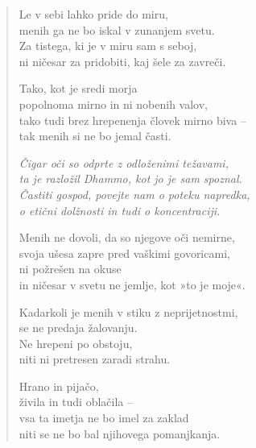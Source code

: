 \clearpage
\begin{verse}

Le v sebi lahko pride do miru,\\
menih ga ne bo iskal v zunanjem svetu.\\
Za tistega, ki je v miru sam s seboj,\\
ni ničesar za pridobiti, kaj šele za zavreči.

Tako, kot je sredi morja\\
popolnoma mirno in ni nobenih valov,\\
tako tudi brez hrepenenja človek mirno biva --\\
tak menih si ne bo jemal časti.

\emph{Čigar oči so odprte z odloženimi težavami,}\\
\emph{ta je razložil Dhammo, kot jo je sam spoznal.}\\
\emph{Častiti gospod, povejte nam o poteku napredka,}\\
\emph{o etični dolžnosti in tudi o koncentraciji.}

Menih ne dovoli, da so njegove oči nemirne,\\
svoja ušesa zapre pred vaškimi govoricami,\\
ni požrešen na okuse\\
in ničesar v svetu ne jemlje, kot »to je moje«.

Kadarkoli je menih v stiku z neprijetnostmi,\\
se ne predaja žalovanju.\\
Ne hrepeni po obstoju,\\
niti ni pretresen zaradi strahu.

Hrano in pijačo,\\
živila in tudi oblačila --\\
vsa ta imetja ne bo imel za zaklad\\
niti se ne bo bal njihovega pomanjkanja.

\end{verse}


